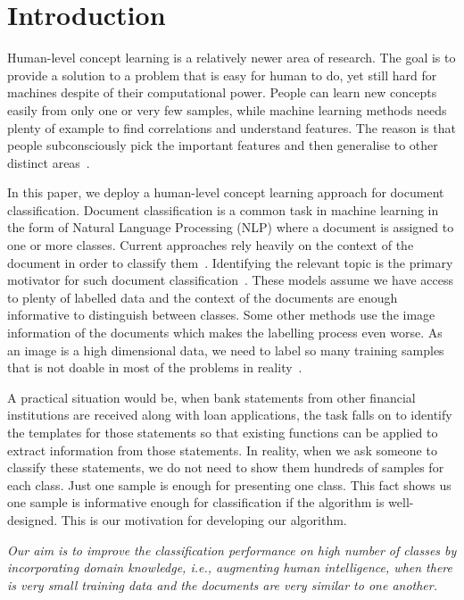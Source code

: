 %
%
\section{Introduction}
Human-level concept learning is a relatively newer area of research. The goal is to provide a solution to a problem that is easy for human to do, yet still hard for machines despite of their computational power. People can learn new concepts easily from only one or very few samples, while machine learning methods needs plenty of example to find correlations and understand features. The reason is that people subconsciously pick the important features and then generalise to other distinct areas~\cite{lake2015,mnih2015}.

In this paper, we deploy a human-level concept learning approach for document classification. Document classification is a common task in machine learning in the form of Natural Language Processing (NLP) where a document is assigned to one or more classes. Current approaches rely heavily on the context of the document in order to classify them~\cite{jones1972,power2010}. Identifying the relevant topic is the primary motivator for such document classification~\cite{hassan2017,kotenko2015,lin2006}. These models assume we have access to plenty of labelled data and the context of the documents are enough informative to distinguish between classes. Some other methods use the image information of the documents which makes the labelling process even worse. As an image is a high dimensional data, we need to label so many training samples that is not doable in most of the problems in reality~\cite{krizhevsky2012}.

A practical situation would be, when bank statements from other financial institutions are received along with loan applications, the task falls on to identify the templates for those statements so that existing functions can be applied to extract information from those statements. In reality, when we ask someone to classify these statements, we do not need to show them hundreds of samples for each class. Just one sample is enough for presenting one class. This fact shows us one sample is informative enough for classification if the algorithm is well-designed. This is our motivation for developing our algorithm. 

\textit{Our aim is to improve the classification performance on high number of classes by incorporating domain knowledge, i.e., augmenting human intelligence, when there is very small training data and the documents are very similar to one another.}

